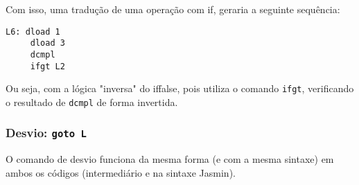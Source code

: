 Com isso, uma tradução de uma operação com if, geraria a seguinte sequência:
\begin{lstlisting}[caption=if com comparação em Jasmin]
L6: dload 1
     dload 3
     dcmpl
     ifgt L2
\end{lstlisting}

Ou seja, com a lógica "inversa" do iffalse, pois utiliza o comando \texttt{ifgt}, verificando o resultado de \texttt{dcmpl} de forma invertida.

\subsubsection{Desvio: \texttt{goto L}}
O comando de desvio funciona da mesma forma (e com a mesma sintaxe) em ambos os códigos (intermediário e na sintaxe Jasmin).

